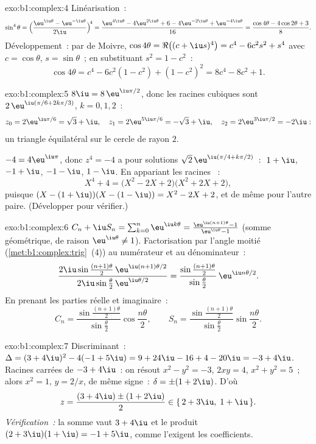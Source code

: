 \begin{solution}{exo:b1:complex:4}
Linéarisation~:
\[
\sin^4\theta
= \Bigl(\frac{\eu^{\iu\theta} - \eu^{-\iu\theta}}{2\iu}\Bigr)^{\!4}
= \frac{\eu^{4\iu\theta} - 4\eu^{2\iu\theta} + 6 - 4\eu^{-2\iu\theta}
+ \eu^{-4\iu\theta}}{16}
= \frac{\cos 4\theta - 4\cos 2\theta + 3}{8}.
\]
Développement~: par de Moivre, $\cos 4\theta = \Re\bigl((c +
\iu s)^4\bigr) = c^4 - 6c^2 s^2 + s^4$ avec $c = \cos\theta$, $s =
\sin\theta$~; en substituant $s^2 = 1 - c^2$~:
\[
\cos 4\theta = c^4 - 6c^2(1 - c^2) + (1 - c^2)^2
= 8c^4 - 8c^2 + 1 .
\]
\end{solution}

\begin{solution}{exo:b1:complex:5}
$8\iu = 8\,\eu^{\iu\pi/2}$, donc les racines cubiques sont
$2\,\eu^{\iu(\pi/6 + 2k\pi/3)}$, $k = 0, 1, 2$~:
\[
z_0 = 2\eu^{\iu\pi/6} = \sqrt 3 + \iu,\quad
z_1 = 2\eu^{5\iu\pi/6} = -\sqrt 3 + \iu,\quad
z_2 = 2\eu^{3\iu\pi/2} = -2\iu :
\]
un triangle équilatéral sur le cercle de rayon $2$.

$-4 = 4\eu^{\iu\pi}$, donc $z^4 = -4$ a pour solutions $\sqrt 2\,
\eu^{\iu(\pi/4 + k\pi/2)}$~: $\;1 + \iu$, $-1 + \iu$, $-1 - \iu$,
$1 - \iu$. En appariant les racines ~:
\[
X^4 + 4 = \bigl(X^2 - 2X + 2\bigr)\bigl(X^2 + 2X + 2\bigr),
\]
puisque $(X - (1+\iu))(X - (1-\iu)) = X^2 - 2X + 2$, et de même pour
l'autre paire. (Développer pour vérifier.)
\end{solution}

\begin{solution}{exo:b1:complex:6}
$C_n + \iu S_n = \sum_{k=0}^{n} \eu^{\iu k\theta} =
\frac{\eu^{\iu(n+1)\theta} - 1}{\eu^{\iu\theta} - 1}$ (somme
géométrique, de raison $\eu^{\iu\theta} \neq 1$). Factorisation par
l'angle moitié (\cref{met:b1:complex:trig}~(4)) au numérateur et au
dénominateur~:
\[
\frac{2\iu\sin\frac{(n+1)\theta}{2}\, \eu^{\iu(n+1)\theta/2}}
{2\iu\sin\frac{\theta}{2}\, \eu^{\iu\theta/2}}
= \frac{\sin\frac{(n+1)\theta}{2}}{\sin\frac{\theta}{2}}\,
\eu^{\iu n\theta/2}.
\]
En prenant les parties réelle et imaginaire~:
\[
C_n = \frac{\sin\frac{(n+1)\theta}{2}}{\sin\frac{\theta}{2}}
\cos\frac{n\theta}{2},
\qquad
S_n = \frac{\sin\frac{(n+1)\theta}{2}}{\sin\frac{\theta}{2}}
\sin\frac{n\theta}{2}.
\]
\end{solution}

\begin{solution}{exo:b1:complex:7}
Discriminant~: $\Delta = (3 + 4\iu)^2 - 4(-1 + 5\iu) = 9 + 24\iu - 16 +
4 - 20\iu = -3 + 4\iu$. Racines carrées de $-3 + 4\iu$~: on résout $x^2
- y^2 = -3$, $2xy = 4$, $x^2 + y^2 = 5$~; alors $x^2 = 1$, $y = 2/x$,
de même signe~: $\delta = \pm(1 + 2\iu)$. D'où
\[
z = \frac{(3 + 4\iu) \pm (1 + 2\iu)}{2}
\in \{\, 2 + 3\iu,\; 1 + \iu \,\}.
\]
\emph{Vérification~:} la somme vaut $3 + 4\iu$ et le produit
$(2+3\iu)(1+\iu) = -1 + 5\iu$, comme l'exigent les coefficients.
\end{solution}

